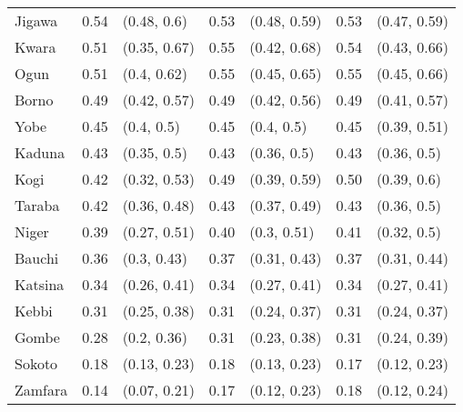 \begin{tabular}{lrlrlrl}
Jigawa & 0.54 & (0.48, 0.6) & 0.53 & (0.48, 0.59) & 0.53 & (0.47, 0.59)\\
Kwara & 0.51 & (0.35, 0.67) & 0.55 & (0.42, 0.68) & 0.54 & (0.43, 0.66)\\
Ogun & 0.51 & (0.4, 0.62) & 0.55 & (0.45, 0.65) & 0.55 & (0.45, 0.66)\\
Borno & 0.49 & (0.42, 0.57) & 0.49 & (0.42, 0.56) & 0.49 & (0.41, 0.57)\\
Yobe & 0.45 & (0.4, 0.5) & 0.45 & (0.4, 0.5) & 0.45 & (0.39, 0.51)\\
Kaduna & 0.43 & (0.35, 0.5) & 0.43 & (0.36, 0.5) & 0.43 & (0.36, 0.5)\\
Kogi & 0.42 & (0.32, 0.53) & 0.49 & (0.39, 0.59) & 0.50 & (0.39, 0.6)\\
Taraba & 0.42 & (0.36, 0.48) & 0.43 & (0.37, 0.49) & 0.43 & (0.36, 0.5)\\
Niger & 0.39 & (0.27, 0.51) & 0.40 & (0.3, 0.51) & 0.41 & (0.32, 0.5)\\
Bauchi & 0.36 & (0.3, 0.43) & 0.37 & (0.31, 0.43) & 0.37 & (0.31, 0.44)\\
Katsina & 0.34 & (0.26, 0.41) & 0.34 & (0.27, 0.41) & 0.34 & (0.27, 0.41)\\
Kebbi & 0.31 & (0.25, 0.38) & 0.31 & (0.24, 0.37) & 0.31 & (0.24, 0.37)\\
Gombe & 0.28 & (0.2, 0.36) & 0.31 & (0.23, 0.38) & 0.31 & (0.24, 0.39)\\
Sokoto & 0.18 & (0.13, 0.23) & 0.18 & (0.13, 0.23) & 0.17 & (0.12, 0.23)\\
Zamfara & 0.14 & (0.07, 0.21) & 0.17 & (0.12, 0.23) & 0.18 & (0.12, 0.24)\\
\bottomrule
\end{tabular}
